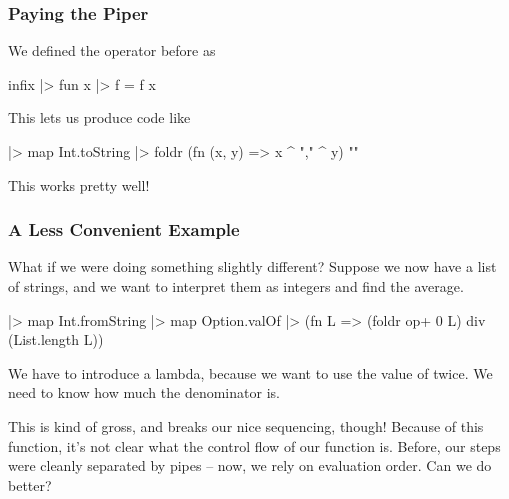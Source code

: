\documentclass[aspectratio=169, handout]{beamer}
\begin{document}
\begin{frame}[fragile]
  \frametitle{Paying the Piper}

  We defined the \code{|>} operator before as
  \begin{codeblock}
    infix |>
    fun x |> f = f x
  \end{codeblock}

  \pause
  \vspace{\fill}

  This lets us produce code like
  \begin{codeblock}
    [1, 2, 3]
    |> map Int.toString
    |> foldr (fn (x, y) => x ^ "," ^ y) ""
  \end{codeblock}

  \pause
  \vspace{\fill}

  This works pretty well!
\end{frame}

\begin{frame}[fragile]
  \frametitle{A Less Convenient Example}

  What if we were doing something slightly different? Suppose we now have
  a list of strings, and we want to interpret them as integers and find the
  average.

  \pause
  \vspace{\fill}

  \begin{codeblock}
    ["1", "2", "3"]
    |> map Int.fromString
    |> map Option.valOf
    |> (fn L => (foldr op+ 0 L) div (List.length L))
  \end{codeblock}

  \pause
  \vspace{\fill}

  We have to introduce a lambda, because we want to use the value of
   twice. We need to know how much the denominator is.

  \pause
  \vspace{\fill}

  This is kind of gross, and breaks our nice sequencing, though! Because of
  this  function, it's not clear what the control flow of our
  function is. Before, our steps were cleanly separated by pipes -- now,
  we rely on evaluation order. Can we do better?
\end{frame}
\end{document}
